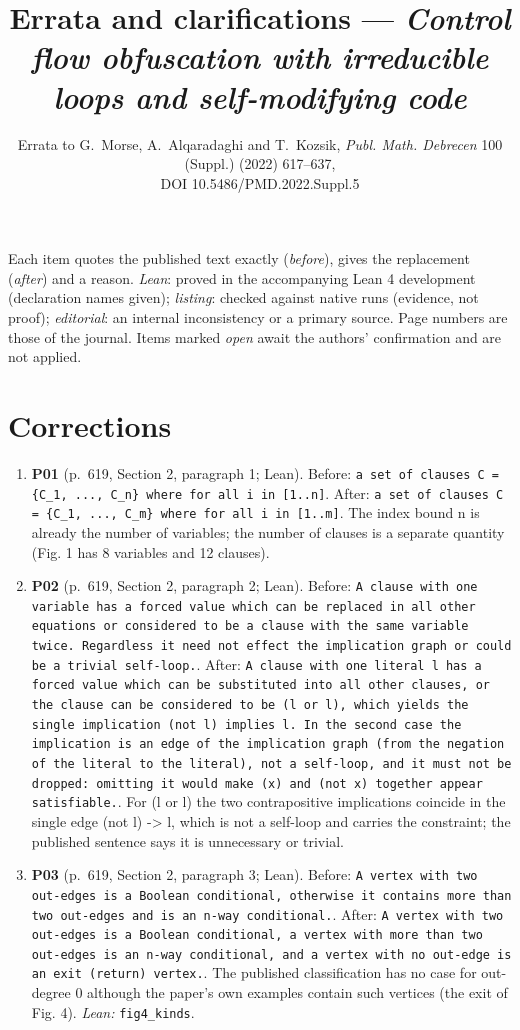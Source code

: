 \documentclass[9pt,twocolumn]{article}
\title{\vspace{-1.2cm}Errata and clarifications --- \emph{Control flow obfuscation with irreducible loops and self-modifying code}}
\author{Errata to G.~Morse, A.~Alqaradaghi and T.~Kozsik, \emph{Publ. Math. Debrecen} 100 (Suppl.) (2022) 617--637,\\ DOI 10.5486/PMD.2022.Suppl.5}
\date{}
\begin{document}
\maketitle
\small
\noindent Each item quotes the published text exactly (\emph{before}), gives the replacement (\emph{after}) and a reason.
\emph{Lean}: proved in the accompanying Lean 4 development (declaration names given); \emph{listing}: checked against native runs
(evidence, not proof); \emph{editorial}: an internal inconsistency or a primary source. Page numbers are those of the journal.
Items marked \emph{open} await the authors' confirmation and are not applied.
\section*{Corrections}
\begin{enumerate}[label=]
\item \textbf{P01} (p.~619, Section 2, paragraph 1; Lean). Before: \texttt{a set of clauses C = \{C\_1, ..., C\_n\} where for all i in [1..n]}. After: \texttt{a set of clauses C = \{C\_1, ..., C\_m\} where for all i in [1..m]}. The index bound n is already the number of variables; the number of clauses is a separate quantity (Fig. 1 has 8 variables and 12 clauses). 
\item \textbf{P02} (p.~619, Section 2, paragraph 2; Lean). Before: \texttt{A clause with one variable has a forced value which can be replaced in all other equations or considered to be a clause with the same variable twice. Regardless it need not effect the implication graph or could be a trivial self-loop.}. After: \texttt{A clause with one literal l has a forced value which can be substituted into all other clauses, or the clause can be considered to be (l or l), which yields the single implication (not l) implies l. In the second case the implication is an edge of the implication graph (from the negation of the literal to the literal), not a self-loop, and it must not be dropped: omitting it would make (x) and (not x) together appear satisfiable.}. For (l or l) the two contrapositive implications coincide in the single edge (not l) -> l, which is not a self-loop and carries the constraint; the published sentence says it is unnecessary or trivial. 
\item \textbf{P03} (p.~619, Section 2, paragraph 3; Lean). Before: \texttt{A vertex with two out-edges is a Boolean conditional, otherwise it contains more than two out-edges and is an n-way conditional.}. After: \texttt{A vertex with two out-edges is a Boolean conditional, a vertex with more than two out-edges is an n-way conditional, and a vertex with no out-edge is an exit (return) vertex.}. The published classification has no case for out-degree 0 although the paper's own examples contain such vertices (the exit of Fig. 4). \emph{Lean:} \texttt{fig4\_kinds}. 

\end{enumerate}
\end{document}
